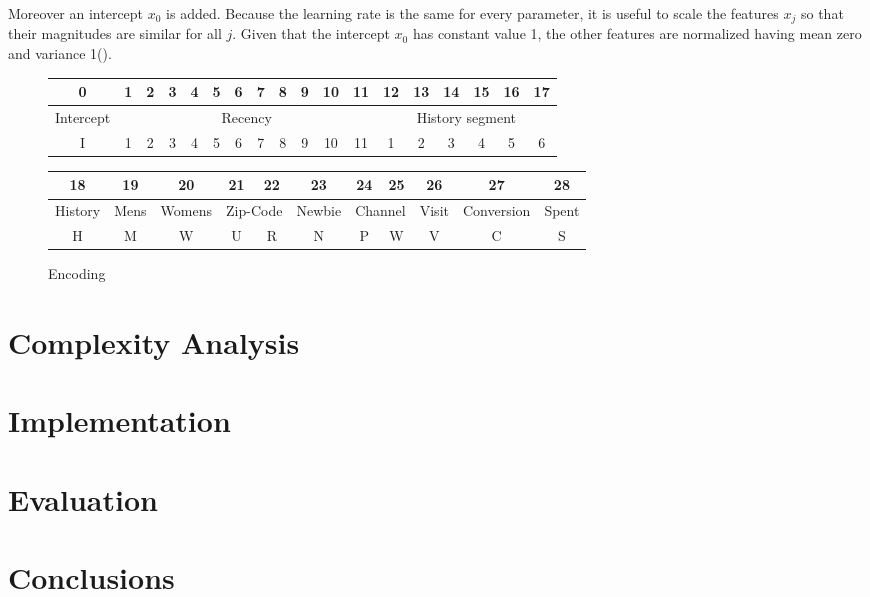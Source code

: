 \documentclass[10pt,twocolumn,letterpaper]{article}
\begin{document}
Moreover an intercept $x_0$ is added.
Because the learning rate is the same for every parameter, it is useful to scale the features $x_j$ so that their magnitudes are similar for all $j$. Given that the intercept $x_0$ has constant value 1, the other features are normalized having mean zero and variance 1(\cite{}).

\begin{figure*}[tb]
	\centering
 	\begin{tabular}{|c|c|c|c|c|c|c|c|c|c|c|c|c|c|c|c|c|c|}
  	\hline
  	 0&1&2&3&4&5&6&7&8&9&10&11&12&13&14&15&16&17\\ 
  	 \hline
  	 Intercept&\multicolumn{11}{|c|}{Recency}&\multicolumn{6}{|c|}{History segment}\\
  	 \hline
		I&1&2&3&4&5&6&7&8&9&10&11&1&2&3&4&5&6\\ 
  	\hline
 		\end{tabular}
 		


 		\begin{tabular}{|c|c|c|c|c|c|c|c|c|c|c|}
  	\hline
  	 18&19&20&21&22&23&24&25&26&27&28\\ 
  	 \hline
  	 History&Mens&Womens&\multicolumn{2}{|c|}{Zip-Code}&Newbie&\multicolumn{2}{|c|}{Channel}&Visit&Conversion&Spent\\
  	 \hline
		H&M&W&U&R&N&P&W&V&C&S\\ 
  	\hline
 		\end{tabular}
\caption{Encoding}
    \label{encoding}
\end{figure*}

\section{Complexity Analysis}

\section{Implementation}


\section{Evaluation}




\section{Conclusions}



{\small


}
\end{document}
